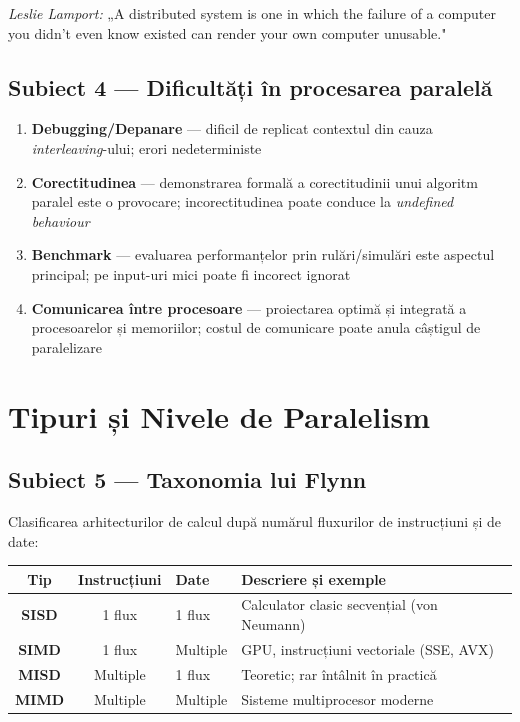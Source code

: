 \documentclass[a4paper,11pt]{article}
\newcommand{\thead}[1]{\cellcolor{tblh}\color{white}\textbf{#1}}
\newcommand{\subiect}[2]{\subsection{Subiect \textcolor{numcol}{#1} — #2}}
\begin{document}
\begin{notebox}
\textit{Leslie Lamport:} „A distributed system is one in which the failure of a computer you didn't even know existed can render your own computer unusable."
\end{notebox}

\subiect{4}{Dificultăți în procesarea paralelă}

\begin{enumerate}
  \item \textbf{Debugging/Depanare} — dificil de replicat contextul din cauza \emph{interleaving}-ului; erori nedeterministe
  \item \textbf{Corectitudinea} — demonstrarea formală a corectitudinii unui algoritm paralel este o provocare; incorectitudinea poate conduce la \emph{undefined behaviour}
  \item \textbf{Benchmark} — evaluarea performanțelor prin rulări/simulări este aspectul principal; pe input-uri mici poate fi incorect ignorat
  \item \textbf{Comunicarea între procesoare} — proiectarea optimă și integrată a procesoarelor și memoriilor; costul de comunicare poate anula câștigul de paralelizare
\end{enumerate}

\section{Tipuri și Nivele de Paralelism}

\subiect{5}{Taxonomia lui Flynn}

Clasificarea arhitecturilor de calcul după numărul fluxurilor de instrucțiuni și de date:

\begin{center}
\begin{tabular}{ccll}
\toprule
\thead{Tip} & \thead{Instrucțiuni} & \thead{Date} & \thead{Descriere și exemple} \\
\midrule
\textbf{SISD} & 1 flux & 1 flux & Calculator clasic secvențial (von Neumann) \\
\textbf{SIMD} & 1 flux & Multiple & GPU, instrucțiuni vectoriale (SSE, AVX) \\
\textbf{MISD} & Multiple & 1 flux & Teoretic; rar întâlnit în practică \\
\textbf{MIMD} & Multiple & Multiple & Sisteme multiprocesor moderne \\
\bottomrule
\end{tabular}
\end{center}
\end{document}
